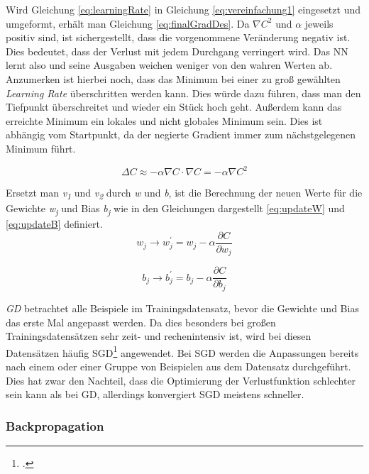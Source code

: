 Wird Gleichung \ref{eq:learningRate} in Gleichung \ref{eq:vereinfachung1} eingesetzt und umgeformt, erhält man Gleichung \ref{eq:finalGradDes}. Da  $\nabla C^2$ und $\alpha$ jeweils positiv sind, ist sichergestellt, dass die vorgenommene Veränderung negativ ist. Dies bedeutet, dass der Verlust mit jedem Durchgang verringert wird. Das \ac{NN} lernt also und seine Ausgaben weichen weniger von den wahren Werten ab. Anzumerken ist hierbei noch, dass das Minimum bei einer zu groß gewählten \textit{Learning Rate} überschritten werden kann. Dies würde dazu führen, dass man den Tiefpunkt überschreitet und wieder ein Stück hoch geht. Außerdem kann das erreichte Minimum ein lokales und nicht globales Minimum sein. Dies ist abhängig vom Startpunkt, da der negierte Gradient immer zum nächstgelegenen Minimum führt.

\begin{equation} \label{eq:finalGradDes}
    \Delta C \approx -\alpha \nabla C \cdot  \nabla C =  -\alpha \nabla C^2
\end{equation}

Ersetzt man \textit{v\textsubscript{1}} und \textit{v\textsubscript{2}} durch \textit{w} und \textit{b}, ist die Berechnung der neuen Werte für die Gewichte \textit{w\textsubscript{j}} und Bias \textit{b\textsubscript{j}} wie in den Gleichungen dargestellt \ref{eq:updateW} und \ref{eq:updateB} definiert.
\begin{equation} \label{eq:updateW}
    w_{j} \rightarrow w_{j}^{'} = w_{j} - \alpha \frac{\partial C}{\partial w_{j}}
\end{equation}

\begin{equation} \label{eq:updateB}
    b_{j} \rightarrow b_{j}^{'} = b_{j} - \alpha \frac{\partial C}{\partial b_{j}}
\end{equation}

\textit{\ac{GD}} betrachtet alle Beispiele im Trainingsdatensatz, bevor die Gewichte und Bias das erste Mal angepasst werden. Da dies  besonders bei großen Trainingsdatensätzen sehr zeit- und rechenintensiv ist, wird bei diesen Datensätzen häufig \ac{SGD}\footcite[Vgl. ][S. 400 ff.]{robbinsStochasticApproximationMethod1951}  angewendet. Bei \ac{SGD} werden die Anpassungen bereits nach einem oder einer Gruppe von Beispielen aus dem Datensatz durchgeführt. Dies hat zwar den Nachteil, dass die Optimierung der Verlustfunktion schlechter sein kann als bei \ac{GD}, allerdings konvergiert \ac{SGD} meistens schneller.

\subsubsection{Backpropagation}

